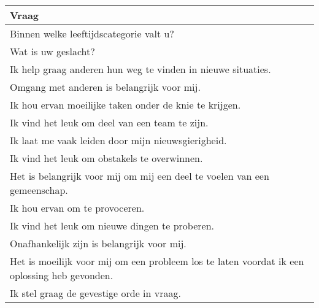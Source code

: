 
\begin{table}
    \begin{tabular}{|p{1.0\linewidth}|}
        \hline
        Vraag                                                                                                               \\
        \hline
        Binnen welke leeftijdscategorie valt u?                                                                             \\
        Wat is uw geslacht?                                                                                                 \\
        Ik help graag anderen hun weg te vinden in nieuwe situaties.                                                        \\
        Omgang met anderen is belangrijk voor mij.                                                                          \\
        Ik hou ervan moeilijke taken onder de knie te krijgen.                                                              \\
        Ik vind het leuk om deel van een team te zijn.                                                                      \\
        Ik laat me vaak leiden door  mijn nieuwsgierigheid.                                                                 \\
        Ik vind het leuk om obstakels te overwinnen.                                                                        \\
        Het is belangrijk voor mij om mij een deel te voelen van een gemeenschap.                                           \\
        Ik hou ervan om te provoceren.                                                                                      \\
        Ik vind het leuk om nieuwe dingen te proberen.                                                                      \\
        Onafhankelijk zijn is belangrijk voor mij.                                                                          \\
        Het is moeilijk voor mij om een probleem los te laten voordat ik een oplossing heb gevonden.                        \\
        Ik stel graag de gevestige orde in vraag.                                                                           \\

\end{tabular}
\end{table}
